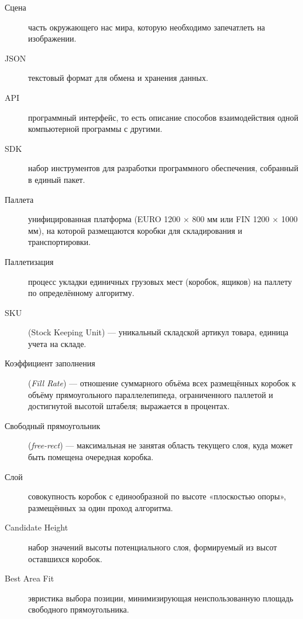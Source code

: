 \Defines %
\begin{description}
    \item[Сцена] часть окружающего нас мира, которую необходимо запечатлеть на изображении.
     
    \item[JSON] текстовый формат для обмена и хранения данных.
    \item[API] программный интерфейс, то есть описание способов взаимодействия одной компьютерной программы с другими.
    \item[SDK] набор инструментов для разработки программного обеспечения, собранный в единый пакет.
    \item[Паллета] унифицированная платформа (EURO 1200 × 800 мм или FIN 1200 × 1000 мм), на которой размещаются коробки для складирования и транспортировки.
    \item[Паллетизация] процесс укладки единичных грузовых мест (коробок, ящиков) на паллету по определённому алгоритму.
    \item[SKU] (Stock Keeping Unit) — уникальный складской артикул товара, единица учета на складе.
    \item[Коэффициент заполнения] (\emph{Fill Rate}) — отношение суммарного объёма всех размещённых коробок к объёму прямоугольного параллелепипеда, ограниченного паллетой и достигнутой высотой штабеля; выражается в процентах.
    \item[Свободный прямоугольник] (\emph{free-rect}) — максимальная не занятая область текущего слоя, куда может быть помещена очередная коробка.
    \item[Слой] совокупность коробок с единообразной по высоте «плоскостью опоры», размещённых за один проход алгоритма.
    \item[Candidate Height] набор значений высоты потенциального слоя, формируемый из высот оставшихся коробок.
    \item[Best Area Fit] эвристика выбора позиции, минимизирующая неиспользованную площадь свободного прямоугольника.
\end{description}

